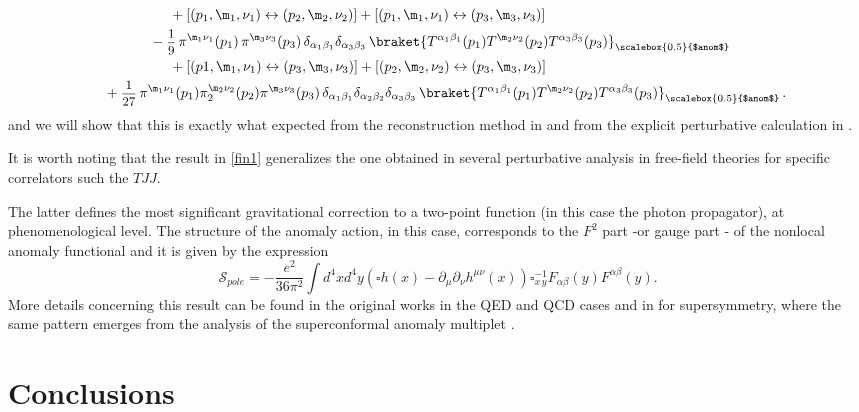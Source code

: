 \documentclass[a4paper,11pt,openright,twoside]{book}
\let\a=\alpha   \let\b=\beta   \let\g=\gamma   \let\d=\delta
\let\n=\nu      \let\x=\xi     \let\p=\pi      \let\r=\rho
\newcommand{\sdfrac}[2]{\mbox{\small$\displaystyle\frac{#1}{#2}$}}
\numberwithin{equation}{section}
\begin{document}
{{{\begin{align}
	&\hspace{2cm}+[(p_1,\m_1,\n_1)\leftrightarrow(p_2,\m_2,\n_2)]+[(p_1,\m_1,\n_1)\leftrightarrow(p_3,\m_3,\n_3)]\notag\\
	&\hspace{1.5cm}-\sdfrac{1}{9}\,\pi^{\m_1\n_1}(p_1)\,\pi^{\m_3\n_3}(p_3)\,\delta_{\a_1\b_1}\delta_{\a_3\b_3}\,\braket{T^{\a_1\b_1}(p_1)T^{\m_2\n_2}(p_2)T^{\a_3\b_3}(p_3)}_{\scalebox{0.5}{$anom$}} \notag\\
	&\hspace{2cm}+[(p1,\m_1,\n_1)\leftrightarrow(p_3,\m_3,\n_3)]+[(p_2,\m_2,\n_2)\leftrightarrow(p_3,\m_3,\n_3)]\notag\\
	&\quad+\sdfrac{1}{27}\,\pi^{\m_1\n_1}(p_1)\pi_2^{\m_2\n_2} (p_2)\pi^{\m_3\n_3}(p_3)\,\delta_{\a_1\b_1}\delta_{\a_2\b_2}\delta_{\a_3\b_3}\,\braket{T^{\a_1\b_1}(p_1)T^{\m_2\n_2}(p_2)T^{\a_3\b_3}(p_3)}_{\scalebox{0.5}{$anom$}}\,.
	\label{fin1}
\end{align}
and we will show that this is exactly what expected from the reconstruction method in \cite{Bzowski:2013sza} and from the explicit perturbative calculation in \cite{Coriano:2018bsy}. 

It is worth noting that the result in \eqref{fin1} generalizes the one obtained in several perturbative analysis in free-field 
theories for specific correlators such the $TJJ$.} The latter defines the most significant gravitational correction to a two-point function (in this case the photon propagator), at phenomenological level.   
The structure of the anomaly action, in this case, corresponds to the $F^2$ part -or gauge part - of the nonlocal anomaly functional and it is given by the expression
\begin{equation}
\label{pole}
\mathcal{S}_{pole}= - \frac{e^2}{ 36 \pi^2}\int d^4 x d^4 y \left(\square h(x) - \partial_\mu\partial_\nu h^{\mu\nu}(x)\right)  \square^{-1}_{x\, y} F_{\alpha\beta}(y)F^{\alpha\beta}(y).
\end{equation}
More details concerning this result can be found in the original works \cite{Giannotti:2008cv,Armillis:2009pq,Armillis:2009im,Armillis:2010qk} in the QED and QCD cases and in \cite{Coriano:2014gja} for supersymmetry, where the same pattern emerges from the analysis of the superconformal anomaly multiplet \cite{Coriano:2019dyc}.

\section{Conclusions}

}}
\end{document}
